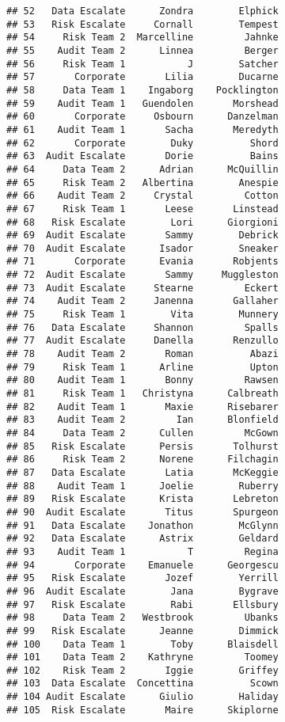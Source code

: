 \documentclass[]{article}
\begin{document}
\begin{verbatim}
## 52   Data Escalate      Zondra        Elphick
## 53   Risk Escalate     Cornall        Tempest
## 54     Risk Team 2  Marcelline         Jahnke
## 55    Audit Team 2      Linnea         Berger
## 56     Risk Team 1           J        Satcher
## 57       Corporate       Lilia        Ducarne
## 58     Data Team 1    Ingaborg    Pocklington
## 59    Audit Team 1   Guendolen       Morshead
## 60       Corporate     Osbourn      Danzelman
## 61    Audit Team 1       Sacha       Meredyth
## 62       Corporate        Duky          Shord
## 63  Audit Escalate       Dorie          Bains
## 64     Data Team 2      Adrian      McQuillin
## 65     Risk Team 2   Albertina        Anespie
## 66    Audit Team 2     Crystal         Cotton
## 67     Risk Team 1       Leese       Linstead
## 68   Risk Escalate        Lori      Giorgioni
## 69  Audit Escalate       Sammy        Debrick
## 70  Audit Escalate      Isador        Sneaker
## 71       Corporate      Evania       Robjents
## 72  Audit Escalate       Sammy     Muggleston
## 73  Audit Escalate     Stearne         Eckert
## 74    Audit Team 2     Janenna       Gallaher
## 75     Risk Team 1        Vita        Munnery
## 76   Data Escalate     Shannon         Spalls
## 77  Audit Escalate     Danella       Renzullo
## 78    Audit Team 2       Roman          Abazi
## 79     Risk Team 1      Arline          Upton
## 80    Audit Team 1       Bonny         Rawsen
## 81     Risk Team 1   Christyna      Calbreath
## 82    Audit Team 1       Maxie      Risebarer
## 83    Audit Team 2         Ian      Blonfield
## 84     Data Team 2      Cullen         McGown
## 85   Risk Escalate      Persis       Tolhurst
## 86     Risk Team 2      Norene      Filchagin
## 87   Data Escalate       Latia       McKeggie
## 88    Audit Team 1      Joelie        Ruberry
## 89   Risk Escalate      Krista       Lebreton
## 90  Audit Escalate       Titus       Spurgeon
## 91   Data Escalate    Jonathon        McGlynn
## 92   Data Escalate      Astrix        Geldard
## 93    Audit Team 1           T         Regina
## 94       Corporate    Emanuele      Georgescu
## 95   Risk Escalate       Jozef        Yerrill
## 96  Audit Escalate        Jana        Bygrave
## 97   Risk Escalate        Rabi       Ellsbury
## 98     Data Team 2   Westbrook         Ubanks
## 99   Risk Escalate      Jeanne        Dimmick
## 100    Data Team 1        Toby      Blaisdell
## 101    Data Team 2    Kathryne         Toomey
## 102    Risk Team 2       Iggie        Griffey
## 103  Data Escalate  Concettina          Scown
## 104 Audit Escalate      Giulio        Haliday
## 105  Risk Escalate       Maire      Skiplorne

\end{verbatim}
\end{document}
